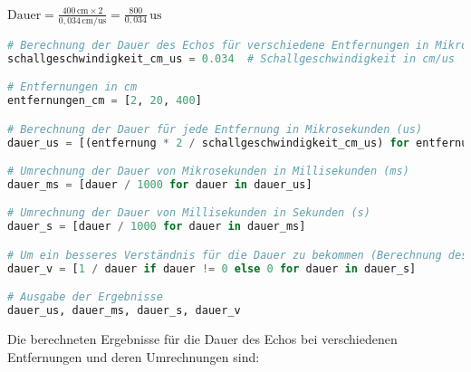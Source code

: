 \documentclass{vorlage-design-main}
\begin{document}
$\text{Dauer} = \frac{400 \, \text{cm} \times 2}{0,034 \, \text{cm/us}} = \frac{800}{0,034} \, \text{us}$

\begin{lstlisting}[language=Python]
# Berechnung der Dauer des Echos für verschiedene Entfernungen in Mikrosekunden
schallgeschwindigkeit_cm_us = 0.034  # Schallgeschwindigkeit in cm/us

# Entfernungen in cm
entfernungen_cm = [2, 20, 400]

# Berechnung der Dauer für jede Entfernung in Mikrosekunden (us)
dauer_us = [(entfernung * 2 / schallgeschwindigkeit_cm_us) for entfernung in entfernungen_cm]

# Umrechnung der Dauer von Mikrosekunden in Millisekunden (ms)
dauer_ms = [dauer / 1000 for dauer in dauer_us]

# Umrechnung der Dauer von Millisekunden in Sekunden (s)
dauer_s = [dauer / 1000 for dauer in dauer_ms]

# Um ein besseres Verständnis für die Dauer zu bekommen (Berechnung des reziproken Werts der Dauer in Sekunden)
dauer_v = [1 / dauer if dauer != 0 else 0 for dauer in dauer_s]

# Ausgabe der Ergebnisse
dauer_us, dauer_ms, dauer_s, dauer_v
\end{lstlisting}

Die berechneten Ergebnisse für die Dauer des Echos bei verschiedenen
Entfernungen und deren Umrechnungen sind:
\end{document}
